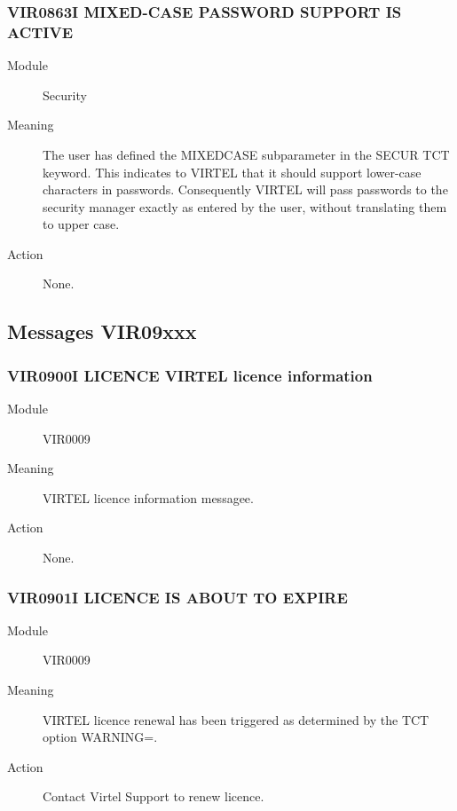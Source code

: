 \documentclass[letterpaper,10pt,english]{sphinxmanual}
\begin{document}
\subsubsection{VIR0863I MIXED-CASE PASSWORD SUPPORT IS ACTIVE}
\label{\detokenize{messages:vir0863i-mixed-case-password-support-is-active}}\begin{description}
\item[{Module}] \leavevmode
Security

\item[{Meaning}] \leavevmode
The user has defined the MIXEDCASE subparameter in the SECUR TCT keyword. This indicates to VIRTEL that it should support lower-case characters in passwords. Consequently VIRTEL will pass passwords to the security manager exactly as entered by the user, without translating them to upper case.

\item[{Action}] \leavevmode
None.

\end{description}


\subsection{Messages VIR09xxx}
\label{\detokenize{messages:messages-vir09xxx}}

\subsubsection{VIR0900I LICENCE VIRTEL licence information}
\label{\detokenize{messages:vir0900i-licence-virtel-licence-information}}\begin{description}
\item[{Module}] \leavevmode
VIR0009

\item[{Meaning}] \leavevmode
VIRTEL licence information messagee.

\item[{Action}] \leavevmode
None.

\end{description}


\subsubsection{VIR0901I LICENCE IS ABOUT TO EXPIRE}
\label{\detokenize{messages:vir0901i-licence-is-about-to-expire}}\begin{description}
\item[{Module}] \leavevmode
VIR0009

\item[{Meaning}] \leavevmode
VIRTEL licence renewal has been triggered as determined by the TCT option WARNING=.

\item[{Action}] \leavevmode
Contact Virtel Support to renew licence.

\end{description}
\end{document}
